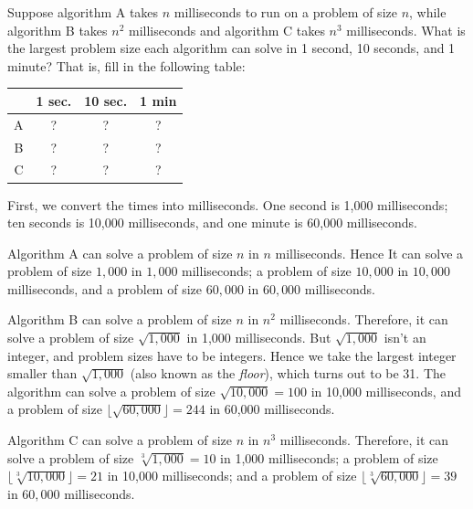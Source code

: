 \begin{prob}
    Suppose algorithm A takes $n$ milliseconds to run on a problem of size $n$,
    while algorithm B takes $n^2$ milliseconds and algorithm C takes $n^3$ milliseconds.
    What is the largest problem size each algorithm can solve in 1 second,
    10 seconds, and 1 minute? That is, fill in the following table:

    \begin{center}
    \begin{tabular}{rccc}
        \toprule
        & 1 sec. & 10 sec. & 1 min\\ \midrule
        A & ? & ? & ?\\
        B & ? & ? & ?\\
        C & ? & ? & ?\\\bottomrule
    \end{tabular}
    \end{center}


    \begin{soln}
        First, we convert the times into milliseconds. One second is 1,000 milliseconds;
        ten seconds is 10,000 milliseconds, and one minute is 60,000 milliseconds.

        Algorithm A can solve a problem of size $n$ in $n$ milliseconds. Hence
        It can solve a problem of size $1,000$ in $1,000$ milliseconds;
        a problem of size $10,000$ in $10,000$ milliseconds, and a problem
        of size $60,000$ in $60,000$ milliseconds.

        Algorithm B can solve a problem of size $n$ in $n^2$ milliseconds.
        Therefore, it can solve a problem of size $\sqrt{1,000}$ in 1,000
        milliseconds. But $\sqrt{1,000}$ isn't an integer, and problem
        sizes have to be integers. Hence we take the largest integer
        smaller than $\sqrt{1,000}$ (also known as the \emph{floor}), which
        turns out to be 31. The algorithm can solve a problem of size
        $\sqrt{10,000} = 100$ in 10,000 milliseconds, and a problem of size
        $\lfloor \sqrt{60,000} \rfloor = 244$ in 60,000 milliseconds.

        Algorithm C can solve a problem of size $n$ in $n^3$ milliseconds.
        Therefore, it can solve a problem of size $\sqrt[3]{1,000} = 10$ in
        1,000 milliseconds; a problem of size $\lfloor\sqrt[3]{10,000}\rfloor = 21$
        in 10,000 milliseconds; and a problem of size
        $\lfloor \sqrt[3]{60,000} \rfloor = 39 $ in $60,000$ milliseconds.


\end{soln}
\end{prob}
